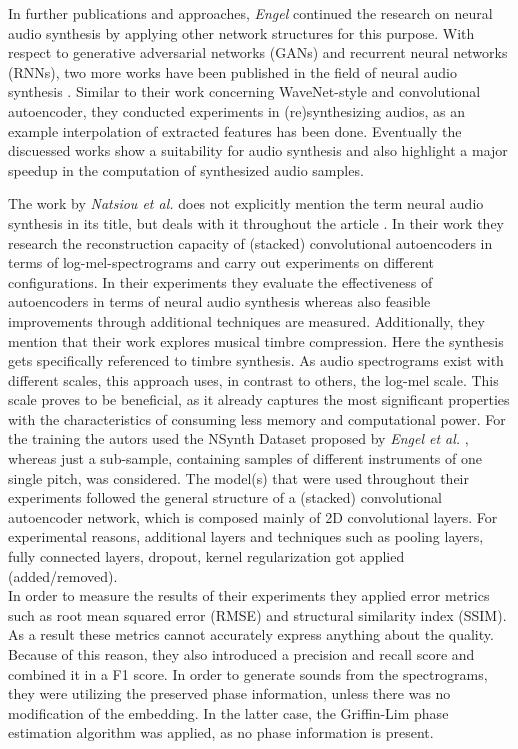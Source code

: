 In further publications and approaches, \textit{Engel} continued the research on neural audio synthesis by applying other network structures for this purpose. With respect to generative adversarial networks (GANs) and recurrent neural networks (RNNs), two more works have been published in the field of neural audio synthesis \cite{Engel2019, hantrakul2019fast}. Similar to their work concerning WaveNet-style and convolutional autoencoder, they conducted experiments in (re)synthesizing audios, as an example interpolation of extracted features has been done. Eventually the discuessed works show a suitability for audio synthesis and also highlight a major speedup in the computation of synthesized audio samples.

The work by \textit{Natsiou et al.} does not explicitly mention the term neural audio synthesis in its title, but deals with it throughout the article \cite{Natsiou2023}. In their work they research the reconstruction capacity of (stacked) convolutional autoencoders in terms of log-mel-spectrograms and carry out experiments on different configurations. In their experiments they evaluate the effectiveness of autoencoders in terms of neural audio synthesis whereas also feasible improvements through additional techniques are measured. Additionally, they mention that their work explores musical timbre compression. Here the synthesis gets specifically referenced to timbre synthesis. As audio spectrograms exist with different scales, this approach uses, in contrast to others, the log-mel scale. This scale proves to be beneficial, as it already captures the most significant properties with the characteristics of consuming less memory and computational power. For the training the autors used the NSynth Dataset proposed by \textit{Engel et al. } \cite{Engel2017}, whereas just a sub-sample, containing samples of different instruments of one single pitch, was considered. The model(s) that were used throughout their experiments followed the general structure of a (stacked) convolutional autoencoder network, which is composed mainly of 2D convolutional layers. For experimental reasons, additional layers and techniques such as pooling layers, fully connected layers, dropout, kernel regularization got applied (added/removed).\\
In order to measure the results of their experiments they applied error metrics such as root mean squared error (RMSE) and structural similarity index (SSIM). As a result these metrics cannot accurately express anything about the quality. Because of this reason, they also introduced a precision and recall score and combined it in a F1 score. In order to generate sounds from the spectrograms, they were utilizing the preserved phase information, unless there was no modification of the embedding. In the latter case, the Griffin-Lim phase estimation algorithm was applied, as no phase information is present.\\

